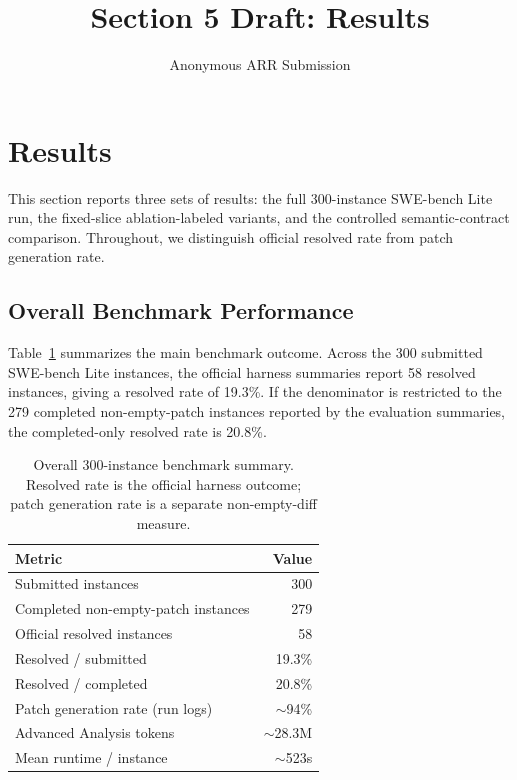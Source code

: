\documentclass[11pt]{article}
\title{Section 5 Draft: Results}
\author{Anonymous ARR Submission}
\begin{document}
\maketitle

\section{Results}
\label{sec:results}

This section reports three sets of results: the full 300-instance SWE-bench Lite run, the fixed-slice ablation-labeled variants, and the controlled semantic-contract comparison.  Throughout, we distinguish official resolved rate from patch generation rate.

\subsection{Overall Benchmark Performance}
\label{subsec:overall-results}

Table~\ref{tab:overall-results} summarizes the main benchmark outcome.  Across the 300 submitted SWE-bench Lite instances, the official harness summaries report 58 resolved instances, giving a resolved rate of 19.3\%.  If the denominator is restricted to the 279 completed non-empty-patch instances reported by the evaluation summaries, the completed-only resolved rate is 20.8\%.

\begin{table}[t]
\centering
\small
\begin{tabular}{lr}
\toprule
Metric & Value \\
\midrule
Submitted instances & 300 \\
Completed non-empty-patch instances & 279 \\
Official resolved instances & 58 \\
Resolved / submitted & 19.3\% \\
Resolved / completed & 20.8\% \\
Patch generation rate (run logs) & $\sim$94\% \\
Advanced Analysis tokens & $\sim$28.3M \\
Mean runtime / instance & $\sim$523s \\
\bottomrule
\end{tabular}
\caption{Overall 300-instance benchmark summary.  Resolved rate is the official harness outcome; patch generation rate is a separate non-empty-diff measure.}
\label{tab:overall-results}
\end{table}
\end{document}
